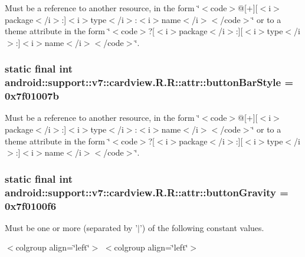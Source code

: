 Must be a reference to another resource, in the form \char`\"{}$<$code$>$@\mbox{[}+\mbox{]}\mbox{[}$<$i$>$package$<$/i$>$:\mbox{]}$<$i$>$type$<$/i$>$:$<$i$>$name$<$/i$>$$<$/code$>$\char`\"{} or to a theme attribute in the form \char`\"{}$<$code$>$?\mbox{[}$<$i$>$package$<$/i$>$:\mbox{]}\mbox{[}$<$i$>$type$<$/i$>$:\mbox{]}$<$i$>$name$<$/i$>$$<$/code$>$\char`\"{}. \hypertarget{classandroid_1_1support_1_1v7_1_1cardview_1_1_r_1_1attr_763ab0eed82c630b909aadeab3a4e3aa}{
\subsubsection[{buttonBarStyle}]{\setlength{\rightskip}{0pt plus 5cm}static final int android::support::v7::cardview.R.R::attr::buttonBarStyle = 0x7f01007b}}
\label{classandroid_1_1support_1_1v7_1_1cardview_1_1_r_1_1attr_763ab0eed82c630b909aadeab3a4e3aa}


Must be a reference to another resource, in the form \char`\"{}$<$code$>$@\mbox{[}+\mbox{]}\mbox{[}$<$i$>$package$<$/i$>$:\mbox{]}$<$i$>$type$<$/i$>$:$<$i$>$name$<$/i$>$$<$/code$>$\char`\"{} or to a theme attribute in the form \char`\"{}$<$code$>$?\mbox{[}$<$i$>$package$<$/i$>$:\mbox{]}\mbox{[}$<$i$>$type$<$/i$>$:\mbox{]}$<$i$>$name$<$/i$>$$<$/code$>$\char`\"{}. \hypertarget{classandroid_1_1support_1_1v7_1_1cardview_1_1_r_1_1attr_54ccdd9772456dbf2d87d22fdaa9c561}{
\subsubsection[{buttonGravity}]{\setlength{\rightskip}{0pt plus 5cm}static final int android::support::v7::cardview.R.R::attr::buttonGravity = 0x7f0100f6}}
\label{classandroid_1_1support_1_1v7_1_1cardview_1_1_r_1_1attr_54ccdd9772456dbf2d87d22fdaa9c561}


Must be one or more (separated by '$|$') of the following constant values. \begin{TabularC}{0}
\hline
\end{TabularC}
$<$colgroup align=\char`\"{}left\char`\"{}$>$ $<$colgroup align=\char`\"{}left\char`\"{}$>$ 

